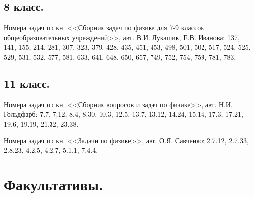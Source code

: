 \documentclass[12pt]{article}
\newlength{\h}
\begin{document}
\subsection{8 класс. }
\label{sec:hockey8}

Номера задач по кн. <<Сборник задач по физике для 7-9 классов
общеобразовательных учреждений>>, авт. В.И. Лукашик, Е.В. Иванова:
137, 141, 155, 214, 281, 307, 323, 379, 428, 435, 451, 453, 498, 501,
502, 517, 524, 525, 529, 531, 532, 577, 581, 633, 641, 648, 650, 657,
749, 752, 754, 759, 781, 783. 

\subsection{11 класс.}
\label{sec:hockey11}

Номера задач по кн. <<Сборник вопросов и задач по физике>>,
авт. Н.И. Гольдфарб: 7.7, 7.12, 8.4, 8.30, 10.3, 12.5, 13.7, 13.12,
14.24, 15.14, 17.3, 17.21, 19.6, 19.19, 21.32, 23.38.

Номера задач по кн. <<Задачи по физике>>, авт. О.Я. Савченко: 2.7.12,
2.7.33, 2.8.23, 4.2.5, 4.2.7, 5.1.1, 7.4.4.


\clearpage
\section{Факультативы.}
\label{sec:spec}
\end{document}
